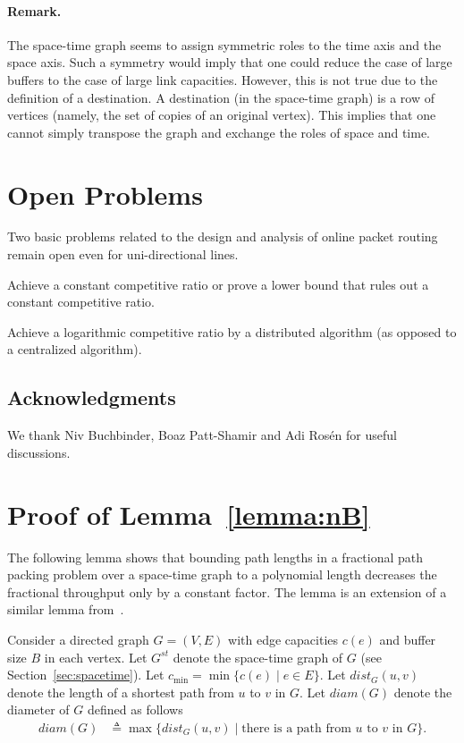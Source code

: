 \documentclass[11pt]{article}
\newcommand{\eqdf}{\triangleq}
\newenvironment{proof sketch}[1]{\noindent {\emph{Proof sketch of #1:}}}{\hfill \qed}
\newcommand{\diam}{\textit{diam}}
\newcommand{\dist}{\textit{dist}}
\begin{document}
\paragraph{Remark.}
The space-time graph seems to assign symmetric roles to the time axis and the space
axis.  Such a symmetry would imply that one could reduce the case of large buffers to
the case of large link capacities. However, this is not true due to the definition of
a destination.  A destination (in the space-time graph) is a row of
vertices (namely, the set of copies of an original vertex).
This implies that one cannot simply transpose the graph and exchange the roles of
space and time.


\section{Open Problems}
Two basic problems related to the design and analysis of
online packet routing remain open even for uni-directional
lines.
\begin{inparaenum}[(i)]
\item Achieve a constant competitive ratio or prove a lower
    bound that rules out a
  constant competitive ratio.
\item Achieve a logarithmic competitive ratio by a distributed algorithm (as opposed
  to a centralized algorithm).
\end{inparaenum}

\subsection*{Acknowledgments}
We thank  Niv Buchbinder, Boaz Patt-Shamir and Adi Ros{\'e}n for useful discussions.







\appendix

\section{Proof of Lemma~\ref{lemma:nB}}\label{sec:proofnB}

The following lemma shows that bounding path lengths in a fractional
path packing problem over a space-time graph to a polynomial
length decreases the fractional throughput only by a constant factor.  The
lemma is an extension of a similar lemma from~\cite{AZ}.

Consider a directed graph $G=(V,E)$ with edge capacities $c(e)$ and
buffer size $B$ in each vertex.  Let $G^{st}$ denote the space-time
graph of $G$ (see Section~\ref{sec:spacetime}).  Let $c_{\min} =
\min\{c(e) \mid e\in E\}$.  Let
$\dist_G(u,v)$ denote the length of a shortest path from $u$ to $v$ in
$G$. Let $\diam(G)$ denote the diameter of $G$ defined as follows
\begin{align*}
  \diam(G) &\eqdf \max \{ \dist_{G}(u,v) \mid \text{there is a path from $u$ to $v$ in $G$}\}.
\end{align*}
\end{document}
